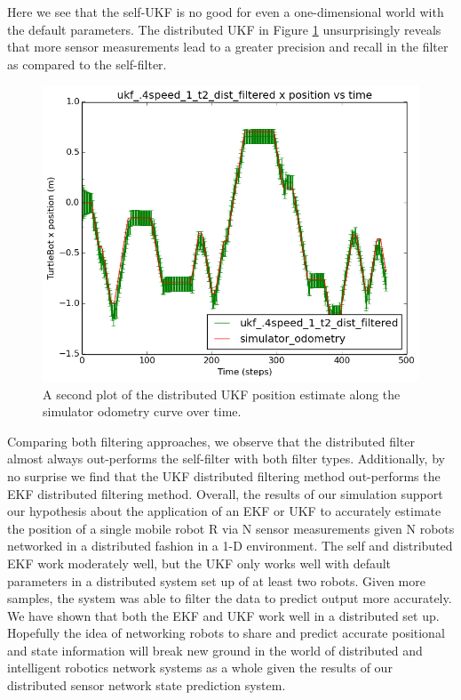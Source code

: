 \documentclass[conference]{IEEEtran} \usepackage[T1]{fontenc} \usepackage[backend=biber, style=ieee]{biblatex}
\begin{document}
Here we see that the self-UKF is no good for even a one-dimensional world with the default parameters.
The distributed UKF in Figure \ref{pic12} unsurprisingly reveals that more sensor measurements lead to a greater
precision and recall in the filter as compared to the self-filter. 

\begin{figure}
\centering 
\includegraphics[scale=.45]{ukf_4speed_1_t2_dist_filtered_pos_err_graph}
\caption {A second plot of the distributed UKF position estimate along the simulator odometry curve over time.}
\label{pic12} 
\end{figure}

Comparing both filtering approaches, we observe that the distributed filter almost always out-performs the self-filter 
with both filter types. Additionally, by no surprise we find that the UKF distributed filtering method out-performs the EKF distributed
filtering method. Overall, the results of our simulation support our hypothesis about the application of an EKF or UKF to accurately
estimate the position of a single mobile robot R via N sensor measurements given N robots networked in a distributed fashion in a 1-D environment. 
The self and distributed EKF work moderately well, but the UKF only works well with default parameters in a distributed system set up of at least 
two robots. Given more samples, the system was able to filter the data to predict output more accurately. We have shown that both the EKF 
and UKF work well in a distributed set up. Hopefully the idea of networking robots to share and predict accurate positional and state information will break new ground in the world of distributed and intelligent robotics network systems as a whole given the results of our distributed sensor network state prediction
system.
\end{document}
